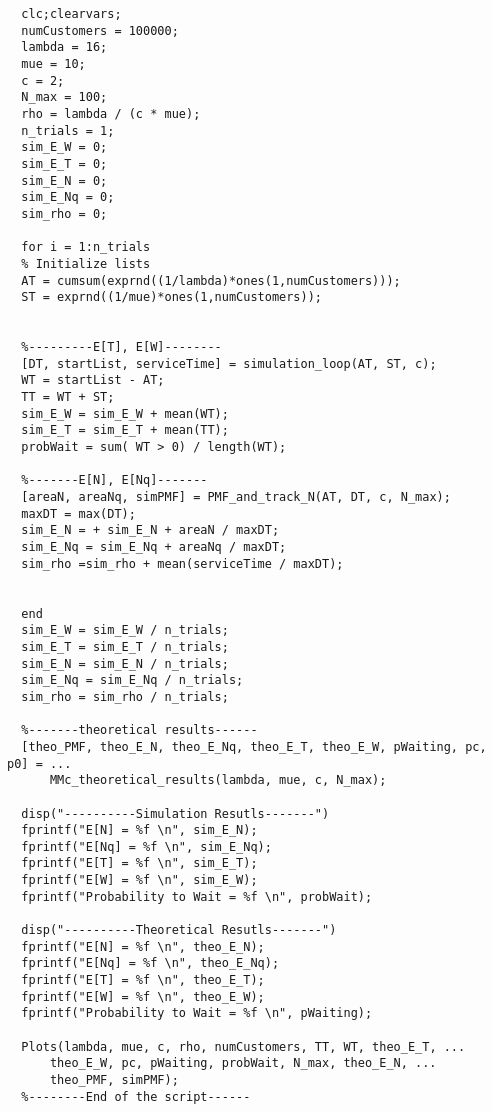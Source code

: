   \begin{lstlisting}[style=Matlab-editor, basicstyle=\ttfamily\footnotesize]
  %----script to simulate and obtaine the distributions-------
  clc;clearvars;
  numCustomers = 100000;
  lambda = 16;
  mue = 10;
  c = 2;
  N_max = 100;
  rho = lambda / (c * mue);
  n_trials = 1;
  sim_E_W = 0;
  sim_E_T = 0;
  sim_E_N = 0;
  sim_E_Nq = 0;
  sim_rho = 0;
  
  for i = 1:n_trials 
  % Initialize lists
  AT = cumsum(exprnd((1/lambda)*ones(1,numCustomers)));
  ST = exprnd((1/mue)*ones(1,numCustomers));
  
  
  %---------E[T], E[W]--------
  [DT, startList, serviceTime] = simulation_loop(AT, ST, c);
  WT = startList - AT;
  TT = WT + ST;
  sim_E_W = sim_E_W + mean(WT);
  sim_E_T = sim_E_T + mean(TT);
  probWait = sum( WT > 0) / length(WT);
  
  %-------E[N], E[Nq]-------
  [areaN, areaNq, simPMF] = PMF_and_track_N(AT, DT, c, N_max);
  maxDT = max(DT);
  sim_E_N = + sim_E_N + areaN / maxDT;
  sim_E_Nq = sim_E_Nq + areaNq / maxDT;
  sim_rho =sim_rho + mean(serviceTime / maxDT);
  
  
  end 
  sim_E_W = sim_E_W / n_trials;
  sim_E_T = sim_E_T / n_trials;
  sim_E_N = sim_E_N / n_trials;
  sim_E_Nq = sim_E_Nq / n_trials;
  sim_rho = sim_rho / n_trials;
  
  %-------theoretical results------
  [theo_PMF, theo_E_N, theo_E_Nq, theo_E_T, theo_E_W, pWaiting, pc, p0] = ...
      MMc_theoretical_results(lambda, mue, c, N_max);
  
  disp("----------Simulation Resutls-------")
  fprintf("E[N] = %f \n", sim_E_N);
  fprintf("E[Nq] = %f \n", sim_E_Nq);
  fprintf("E[T] = %f \n", sim_E_T);
  fprintf("E[W] = %f \n", sim_E_W);
  fprintf("Probability to Wait = %f \n", probWait);
  
  disp("----------Theoretical Resutls-------")
  fprintf("E[N] = %f \n", theo_E_N);
  fprintf("E[Nq] = %f \n", theo_E_Nq);
  fprintf("E[T] = %f \n", theo_E_T);
  fprintf("E[W] = %f \n", theo_E_W);
  fprintf("Probability to Wait = %f \n", pWaiting);
  
  Plots(lambda, mue, c, rho, numCustomers, TT, WT, theo_E_T, ...
      theo_E_W, pc, pWaiting, probWait, N_max, theo_E_N, ...
      theo_PMF, simPMF);
  %--------End of the script------
  \end{lstlisting}
  
